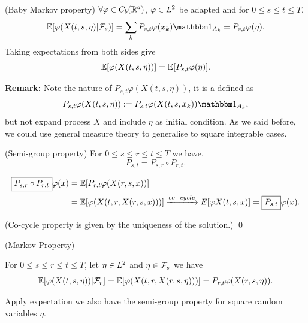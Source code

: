 \begin{lem}{(Baby Markov property)}
$\forall \varphi \in C_b(\mathbb{R}^d)$, $\varphi\in L^{2}$ be adapted and for $0 \leq s \leq t \leq T$,
\begin{equation*}
    \E[\varphi(X(t,s,\eta)|\F_s)] = \bigs{k}P_{s,t}\varphi(x_k) \I{A_k} =  P_{s,t}\varphi(\eta).
\end{equation*}
Taking expectations from both sides give
\begin{equation*}
    \mathbb{E}[\varphi(X(t,s,\eta))]  =  \mathbb{E}[P_{s,t}\varphi(\eta)].
\end{equation*}
\end{lem}
\textbf{Remark:}  Note the nature of $P_{s,t}\varphi(X(t,s,\eta))$, it is a  defined as
\begin{equation*}
    P_{s,t}\varphi(X(t,s,\eta)) := P_{s,t}\varphi(X(t,s,x_k)) \I{A_k},
\end{equation*} but not expand process $X$ and include $\eta$ as initial condition. As we said before, we could use general measure theory to generalise to square integrable cases.
\vspace{2cm}
\begin{lem}{(Semi-group property)}
For $0 \leq s\leq r \leq t \leq T$ we have,
\begin{equation*}
    \boxed{P_{s,t} = P_{s,r}\circ P_{r,t}.}
\end{equation*}
\end{lem}
\pf 
\begin{align*}
    \boxed{P_{s,r}\circ P_{r,t}} \varphi (x) &= \mathbb{E}[P_{r,t}\varphi (X(r,s,x))] \\
    &= \mathbb{E}[\varphi(X(t,r,X(r,s,x)))] \xrightarrow{co-cycle} E[\varphi X(t,s,x)] = \boxed{P_{s,t}}\varphi(x).
\end{align*}

(Co-cycle property is given by the uniqueness of the solution.)
\qed

\begin{thm}{(Markov Property)}

For $0\leq s\leq r\leq t\leq T$, let $\eta\in L^{2}$ and $\eta\in\mathcal{F}_s$ we have
\begin{equation*}
    \mathbb{E}[\varphi(X(t,s,\eta))|\mathcal{F}_r] = \mathbb{E}[\varphi(X(t,r,X(r,s,\eta)))] = P_{r,t}\varphi(X(r,s,\eta)).
\end{equation*}

Apply expectation we also have the semi-group property for square random variables $\eta$.
\end{thm}

